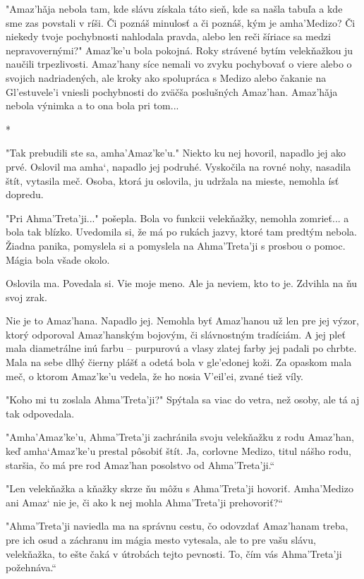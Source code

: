\documentclass{book}
\begin{document}
"$ $Amaz'ha\v{}ja nebola tam, kde slávu získala táto sieň, kde sa našla tabuľa a kde sme zas povstali v ríši. Či poznáš minulosť a či poznáš, kým je amha'Medizo? Či niekedy tvoje pochybnosti nahlodala pravda, alebo len reči šíriace sa medzi nepravovernými?"$ $ Amaz'ke'u bola pokojná. Roky strávené bytím velekňažkou ju naučili trpezlivosti. Amaz'hany síce nemali vo zvyku pochybovať o viere alebo o svojich nadriadených, ale kroky ako spolupráca s Medizo alebo čakanie na Gl'estuvele'i vniesli pochybnosti do zväčša poslušných Amaz'han. Amaz'ha\v{}ja nebola výnimka a to ona bola pri tom...

\begin{center}
*
\end{center}

"$ $Tak prebudili ste sa, amha'Amaz'ke'u."$ $ Niekto ku nej hovoril, napadlo jej ako prvé. Oslovil ma amha‘, napadlo jej podruhé. Vyskočila na rovné nohy, nasadila štít, vytasila meč. Osoba, ktorá ju oslovila, ju udržala na mieste, nemohla ísť dopredu.

"$ $Pri Ahma'Treta'ji..."$ $ pošepla. Bola vo funkcii velekňažky, nemohla zomrieť... a bola tak blízko. Uvedomila si, že má po rukách jazvy, ktoré tam predtým nebola. Žiadna panika, pomyslela si a pomyslela na Ahma'Treta'ji s prosbou o pomoc. Mágia bola všade okolo.

Oslovila ma. Povedala si. Vie moje meno. Ale ja neviem, kto to je. Zdvihla na ňu svoj zrak.

Nie je to Amaz'hana. Napadlo jej. Nemohla byť Amaz'hanou už len pre jej výzor, ktorý odporoval Amaz'hanským bojovým, či slávnostným tradíciám. A jej pleť mala diametrálne inú farbu – purpurovú a vlasy zlatej farby jej padali po chrbte. Mala na sebe dlhý čierny plášť a odetá bola v gle'edonej koži. Za opaskom mala meč, o ktorom Amaz'ke'u vedela, že ho nosia V'eil'ei, zvané tiež víly.

"$ $Koho mi tu zoslala Ahma'Treta'ji?"$ $ Spýtala sa viac do vetra, než osoby, ale tá aj tak odpovedala.

"$ $Amha'Amaz'ke'u, Ahma'Treta'ji zachránila svoju velekňažku z rodu Amaz'han, keď amha‘Amaz'ke'u prestal pôsobiť štít. Ja, corlovne Medizo, titul nášho rodu, staršia, čo má pre rod Amaz'han posolstvo od Ahma'Treta'ji.“

"$ $Len velekňažka a kňažky skrze ňu môžu s Ahma'Treta'ji hovoriť. Amha'Medizo ani Amaz‘ nie je, či ako k nej mohla Ahma'Treta'ji prehovoriť?“

"$ $Ahma'Treta'ji naviedla ma na správnu cestu, čo odovzdať Amaz'hanam treba, pre ich osud a záchranu im mágia mesto vytesala, ale to pre vašu slávu, velekňažka, to ešte čaká v útrobách tejto pevnosti. To, čím vás Ahma'Treta'ji požehnáva.“
\end{document}
